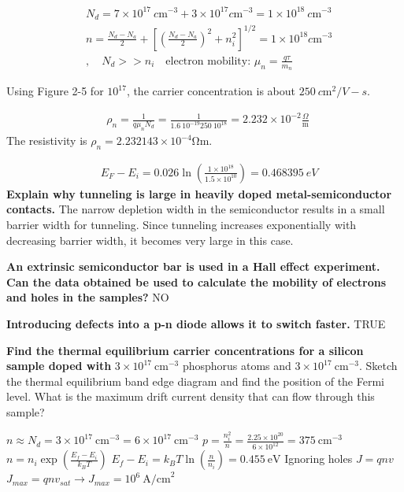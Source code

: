 \begin{multicols}{3}
\begin{align*}
& N_d = 7 \times 10^{17} \ \si{c \meter}^{-3} + 3\times 10^{17}  \si{c \meter}^{-3} = 1\times 10^{18} \ \si{c \meter}^{-3} \\
& n = \frac{N_d-N_a}{2}+\left[ \left(\frac{N_d-N_a}{2} \right)^2 + n_i^2 \right]^{1/2}= 1 \times 10^{18} \si{c \meter}^{-3}\\
& , \quad N_d >> n_i \quad \text{electron mobility: } \mu_n = \frac{q \tau}{m_n}
\end{align*}

Using Figure 2-5 for $10^{17}$, the carrier concentration is about $250 \ \si{c \meter}^2 / V-s$.

\begin{align*}
& \rho_n=\frac{1}{q \mu_n N_d}= \frac{1}{1.6 \ 10^{-19}250 \ 10^{18}} = 2.232 \times 10^{-2}\frac{\Omega}{\text{m}} \ 
 \end{align*}
The resistivity is $\rho_n = 2.232143 \times  10^{-4} \si{\ohm} \si{\meter}$.

\begin{align*}
& E_F - E_i = 0.026 \ln \left(\frac{1 \times 10^{18}}{1.5 \times 10^{10}} \right) = 0.468395 \ eV
\end{align*}
\textbf{Explain why tunneling is large in heavily doped metal-semiconductor contacts.} The narrow depletion width in the semiconductor results in a small barrier width for tunneling. Since tunneling increases exponentially with decreasing barrier width, it becomes very large in this case. \hfill \linebreak

\textbf{An extrinsic semiconductor bar is used in a Hall effect experiment. Can the data obtained be used to calculate the mobility of electrons and holes in the samples?} NO \hfill \break

\textbf{Introducing defects into a p-n diode allows it to switch faster.} TRUE

\textbf{Find the thermal equilibrium carrier concentrations for a silicon sample doped with} $3 \times 10^{17} \ \text{cm}^{-3}$ phosphorus atoms and $3 \times 10^{17} \ \text{cm}^{-3}$. Sketch the thermal equilibrium band edge diagram and find the position of the Fermi level. What is the maximum drift current density that can flow through this sample?

$n \approx N_d = 3 \times 10^{17} \ \text{cm}^{-3}= 6 \times 10^{17} \ \text{cm}^{-3}$
$p=\frac{n_i^2}{n}=\frac{2.25 \times 10^{20}}{6 \times 10^{12}}= 375 \ \text{cm}^{-3}$
$n=n_i \exp\left( \frac{E_f-E_i}{k_BT}\right)$ \hfill \linebreak
$E_f-E_i=k_B T \ln \left( \frac{n}{n_i} \right)=0.455 \ \text{eV}$ \hfill \break
Ignoring holes
$J=qnv$
$J_{max}=qnv_{sat} \rightarrow J_{max}=10^{6} \ \text{A/cm}^2$


\end{multicols}
